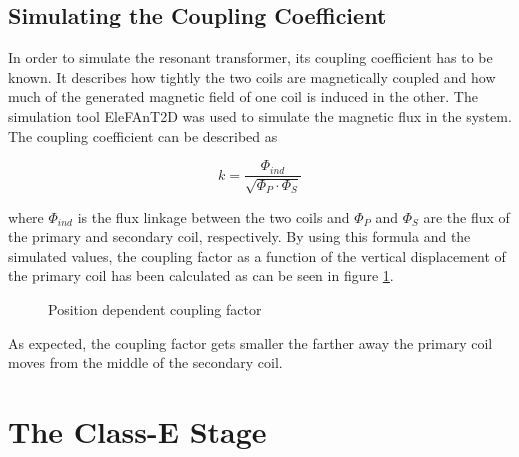 \subsection{Simulating the Coupling Coefficient}

In order to simulate the resonant transformer, its coupling coefficient has to be known. It describes how tightly the two coils are magnetically coupled and how much of the generated magnetic field of one coil is induced in the other. The simulation tool EleFAnT2D was used to simulate the magnetic flux in the system. The coupling coefficient can be described as

\begin{equation}
    k = \frac{\Phi_{ind}}{\sqrt{\Phi_P \cdot \Phi_S}}
\end{equation}

where \(\Phi_{ind}\) is the flux linkage between the two coils and \(\Phi_P\) and \(\Phi_S\) are the flux of the primary and secondary coil, respectively. By using this formula and the simulated values, the coupling factor as a function of the vertical displacement of the primary coil has been calculated as can be seen in figure \ref{fig:coupling-factor}.

\begin{figure}[h!]
    \centering
    \caption{Position dependent coupling factor}
    \label{fig:coupling-factor}
\end{figure}

As expected, the coupling factor gets smaller the farther away the primary coil moves from the middle of the secondary coil.

\section{The Class-E Stage}

